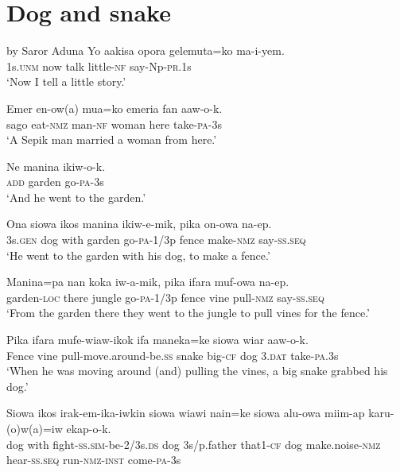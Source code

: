 \section{Dog and snake}\label{app:2:dog}
by Saror Aduna
\ea
\gll  Yo  aakisa  opora  gelemuta=ko  ma-i-yem. \\
1s.\textsc{unm}  now  talk  little-\textsc{nf}  say-Np-\textsc{pr}.1s \\
\glt ‘Now I tell a little story.’ \\
\z


\ea
\gll  Emer  en-ow(a)  mua=ko  emeria  fan  aaw-o-k. \\
sago  eat-\textsc{nmz}  man-\textsc{nf}  woman  here  take-\textsc{pa}-3s \\
\glt ‘A Sepik man married a woman from here.’ \\
\z


\ea
\gll  Ne  manina  ikiw-o-k. \\
\textsc{add}  garden  go-\textsc{pa}-3s \\
\glt ‘And he went to the garden.’ \\
\z


\ea
\gll  Ona  siowa  ikos  manina  ikiw-e-mik,  pika  on-owa  na-ep. \\
3s.\textsc{gen}  dog  with  garden  go-\textsc{pa}-1/3p  fence  make-\textsc{nmz}  say-\textsc{ss.seq} \\
\glt ‘He went to the garden with his dog, to make a fence.’ \\
\z


\ea
\gll  Manina=pa  nan  koka  iw-a-mik,  pika  ifara  muf-owa  na-ep. \\
garden-\textsc{loc}  there  jungle  go-\textsc{pa}-1/3p  fence  vine  pull-\textsc{nmz}  say-\textsc{ss.seq} \\
\glt ‘From the garden there they went to the jungle to pull vines for the fence.’ \\
\z


\ea
\gll  Pika  ifara  mufe-wiaw-ikok  ifa  maneka=ke  siowa  wiar  aaw-o-k. \\
Fence  vine  pull-move.around-be.\textsc{ss}  snake  big-\textsc{cf}  dog  3.\textsc{dat}  take-\textsc{pa}.3s \\
\glt ‘When he was moving around (and) pulling the vines, a big snake grabbed his dog.’ \\
\z


\ea
\gll  Siowa  ikos  irak-em-ika-iwkin  siowa  wiawi  nain=ke    siowa  alu-owa  miim-ap  karu-(o)w(a)=iw  ekap-o-k. \\
dog  with  fight-\textsc{ss}.\textsc{sim}-be-2/3s.\textsc{ds}  dog  3s/p.father  that1-\textsc{cf} dog  make.noise-\textsc{nmz}  hear-\textsc{ss.seq}  run-\textsc{nmz}-\textsc{inst}  come-\textsc{pa}-3s \\


